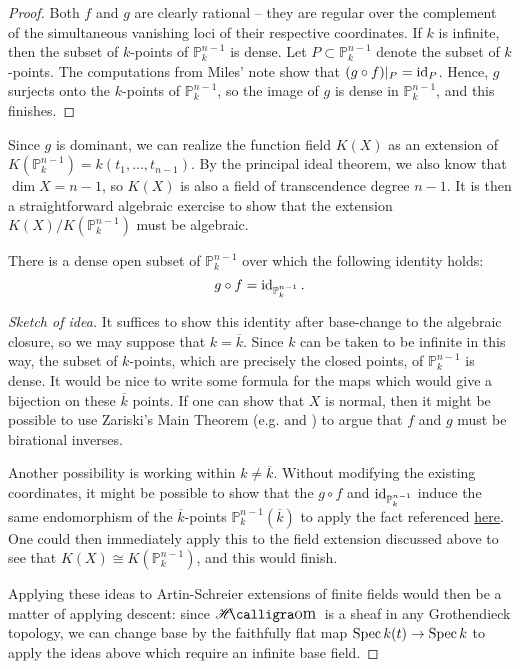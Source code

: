 \documentclass[letterpaper, openany, 10pt]{article}
\begin{document}
\begin{proof}
	Both $f$ and $g$ are clearly rational -- they are regular over the complement of the simultaneous vanishing loci of their respective coordinates. If $k$ is infinite, then the subset of $k$-points of $\mathbb{P}_k^{n-1}$ is dense. Let $P \subset \mathbb{P}_k^{n-1}$ denote the subset of $k$-points. The computations from Miles' note show that $(g \circ f)|_P = \operatorname{id}_P$. Hence, $g$ surjects onto the $k$-points of $\mathbb{P}_k^{n-1}$, so the image of $g$ is dense in $\mathbb{P}_k^{n-1}$, and this finishes.
\end{proof}

Since $g$ is dominant, we can realize the function field $K(X)$ as an extension of $K(\mathbb{P}_k^{n-1}) = k(t_1, \ldots, t_{n-1})$. By the principal ideal theorem, we also know that $\dim X = n-1$, so $K(X)$ is also a field of transcendence degree $n-1$. It is then a straightforward algebraic exercise to show that the extension $K(X)/K(\mathbb{P}_k^{n-1})$ must be algebraic. 

\begin{claim}
	There is a dense open subset of $\mathbb{P}_k^{n-1}$ over which the following identity holds:
	\[
		g \circ f = \operatorname{id}_{\mathbb{P}_k^{n-1}}.
	\]
\end{claim}

\begin{proof}[Sketch of idea]
	It suffices to show this identity after base-change to the algebraic closure, so we may suppose that $k = \overline{k}$. Since $k$ can be taken to be infinite in this way, the subset of $k$-points, which are precisely the closed points, of $\mathbb{P}_k^{n-1}$ is dense. It would be nice to write some formula for the maps which would give a bijection on these $\overline{k}$ points. If one can show that $X$ is normal, then it might be possible to use Zariski's Main Theorem (e.g.\cite[\href{https://stacks.math.columbia.edu/tag/03GW}{Lemma 03GW}]{stacks-project} and \cite{264216}) to argue that $f$ and $g$ must be birational inverses. 

	Another possibility is working within $k \neq \overline{k}$. Without modifying the existing coordinates, it might be possible to show that the $g \circ f$ and $\operatorname{id}_{\mathbb{P}_k^{n-1}}$ induce the same endomorphism of the $\overline{k}$-points $\mathbb{P}_k^{n-1}(\overline{k})$ to apply the fact referenced \href{https://math.stackexchange.com/q/630465}{here}. One could then immediately apply this to the field extension discussed above to see that $K(X) \cong K(\mathbb{P}_k^{n-1})$, and this would finish.

	Applying these ideas to Artin-Schreier extensions of finite fields would then be a matter of applying descent: since $\SheafHom$ is a sheaf in any Grothendieck topology, we can change base by the faithfully flat map $\operatorname{Spec} k(t) \to \operatorname{Spec} k$ to apply the ideas above which require an infinite base field.
\end{proof}



\end{document}
